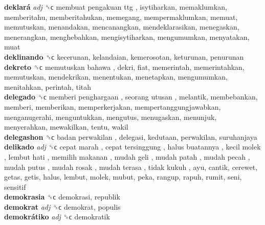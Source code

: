 \textbf{deklará} \emph{adj}  ␝ϲ   membuat pengakuan ttg , isytiharkan, memaklumkan, memberitahu, memberitahukan, memegang, mempermaklumkan, memuat, memutuskan, menandakan, mencanangkan, mendeklarasikan, menegaskan, menerangkan, menghebahkan, mengisytiharkan, mengumumkan, menyatakan, muat  \\
\textbf{deklinando} ␝ϲ  kecerunan, kelandaian, kemerosotan, keturunan, penurunan  \\
\textbf{dekreto} ␝ϲ   memutuskan bahawa , dekri, fiat, memerintah, memerintahkan, memutuskan, mendekrikan, menentukan, menetapkan, mengumumkan, menitahkan, perintah, titah  \\
\textbf{delegado} ␝ϲ   memberi penghargaan ,  seorang utusan , melantik, membebankan, memberi, memberikan, memperkerjakan, mempertanggungjawabkan, menganugerahi, menguntukkan, mengutus, menugaskan, menunjuk, menyerahkan, mewakilkan, tentu, wakil  \\
\textbf{delegashon} ␝ϲ   badan perwakilan , delegasi, kedutaan, perwakilan, suruhanjaya  \\
\textbf{delikado} \emph{adj}  ␝ϲ   cepat marah ,  cepat tersinggung ,  halus buatannya ,  kecil molek ,  lembut hati ,  memilih makanan ,  mudah geli ,  mudah patah ,  mudah pecah ,  mudah putus ,  mudah rosak ,  mudah terasa ,  tidak kukuh , ayu, cantik, cerewet, getas, getis, halus, lembut, molek, mubut, peka, rangup, rapuh, rumit, seni, sensitif  \\
\textbf{demokrasia} ␝ϲ  demokrasi, republik  \\
\textbf{demokrat} \emph{adj}  ␝ϲ  demokrat, populis  \\
\textbf{demokrátiko} \emph{adj}  ␝ϲ  demokratik  \\
